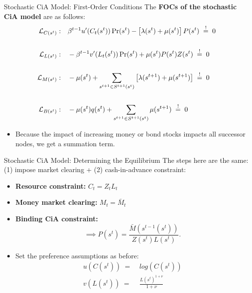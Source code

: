 \documentclass[10pt,c,aspectratio=1610,handout]{beamer}
\begin{document}
\begin{frame}{Stochastic CiA Model: First-Order Conditions}%
  The \textbf{FOCs of the stochastic CiA model} are as follows:%
  \begin{align}%
    \mathcal{L}_{C(s^t)}: & \quad \beta ^{t-1}u^{\prime }(C_t(s^{t}))\Pr (s^{t})-\left[ \lambda (s^{t})+\mu(s^{t})\right] P(s^{t}) \; \overset{!}{=} \; 0\\%
    \notag \\%
    \mathcal{L}_{L(s^t)}: & \quad -\beta ^{t-1}v^{\prime }(L_t(s^{t}))\Pr (s^{t})+\mu (s^{t})P(s^{t})Z(s^{t}) \; \overset{!}{=} \; 0\\%
    \notag \\%
    \mathcal{L}_{M(s^t)}: & \quad -\mu (s^{t})+\sum_{s^{t+1}\in S^{t+1}(s^{t})}\left[ \lambda (s^{t+1})+\mu(s^{t+1})\right] \; \overset{!}{=} \; 0\\%
    \notag \\%
    \mathcal{L}_{B(s^t)}: & \quad -\mu (s^{t})q(s^{t})+\sum_{s^{t+1}\in S^{t+1}(s^{t})}\mu (s^{t+1}) \; \overset{!}{=} \;0%
  \end{align}%
  \begin{itemize}%
    \item[$\rightarrow$] Because the impact of increasing money or bond stocks impacts all successor nodes, we get a summation term.%
  \end{itemize}%
\end{frame}%
\begin{frame}{Stochastic CiA Model: Determining the Equilibrium}%
  The steps here are the same: (1) impose market clearing + (2) cash-in-advance constraint:%
  \vspace*{0.15in}%
  \pause%
  \begin{itemize}%
    \item[$\blacktriangleright$] \textbf{Resource constraint:} $C_t = Z_t L_t$%
    \vspace*{0.15in}%
    \item[$\blacktriangleright$] \textbf{Money market clearing:} $M_t = \bar M_t$%
    \vspace*{0.15in}%
    \item[$\blacktriangleright$] \textbf{Binding CiA constraint:}%
    \begin{equation}%
      \implies P(s^{t})=\frac{\bar{M}(s^{t-1}(s^{t}))}{Z(s^{t})L(s^{t})}.%
      \label{price level 1}%
    \end{equation}%
    \vspace*{0.15in}%
    \pause%
    \item[$\blacktriangleright$] Set the preference assumptions as before:%
    \begin{align*}%
      u(C(s^t)) \; = & \; log(C(s^t))\\%
      v(L(s^t)) \; = & \; \frac{L(s^t)^{1+\nu}}{1+\nu}%
    \end{align*}%
  \end{itemize}%
\end{frame}%
\end{document}
